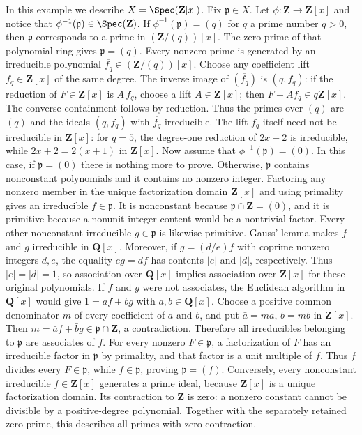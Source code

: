 \begin{example}
\label{editorial-source-example-spec-Zx}
In this example we describe $X = \Spec(\mathbf{Z}[x])$.
Fix $\mathfrak p \in X$.
Let $\phi : \mathbf{Z} \to \mathbf{Z}[x]$ and notice
that $\phi^{-1}(\mathfrak p) \in \Spec(\mathbf{Z})$.
If $\phi^{-1}(\mathfrak p) = (q)$ for $q$ a prime number $q > 0$,
then $\mathfrak p$ corresponds to a prime in $(\mathbf{Z}/(q))[x]$.
The zero prime of that polynomial ring gives $\mathfrak p=(q)$.
Every nonzero prime is generated by an irreducible polynomial
$\overline{f_q}\in(\mathbf{Z}/(q))[x]$.
Choose any coefficient lift $f_q\in\mathbf{Z}[x]$ of the same degree.
The inverse image of $(\overline{f_q})$ is $(q,f_q)$: if the reduction
of $F\in\mathbf Z[x]$ is $\overline A\,\overline{f_q}$, choose a lift
$A\in\mathbf Z[x]$; then $F-Af_q\in q\mathbf Z[x]$.
The converse containment follows by reduction.
Thus the primes over $(q)$ are $(q)$ and the ideals $(q,f_q)$ with
$\overline{f_q}$ irreducible. The lift $f_q$ itself need not be
irreducible in $\mathbf Z[x]$: for $q=5$, the degree-one reduction
of $2x+2$ is irreducible, while $2x+2=2(x+1)$ in $\mathbf Z[x]$.
Now assume that $\phi^{-1}(\mathfrak p)=(0)$.
In this case, if $\mathfrak p = (0)$ there is nothing more to prove. Otherwise, $\mathfrak p$ contains nonconstant polynomials
and it contains no nonzero integer. Factoring any nonzero member
in the unique factorization domain $\mathbf Z[x]$ and using primality
gives an irreducible $f\in\mathfrak p$. It is nonconstant because
$\mathfrak p\cap\mathbf Z=(0)$, and it is primitive because a
nonunit integer content would be a nontrivial factor.
Every other nonconstant irreducible $g\in\mathfrak p$ is likewise primitive.
Gauss' lemma makes $f$ and $g$ irreducible in $\mathbf Q[x]$.
Moreover, if $g=(d/e)f$ with coprime nonzero integers $d,e$,
the equality $eg=df$ has contents $|e|$ and $|d|$, respectively.
Thus $|e|=|d|=1$, so association over $\mathbf Q[x]$ implies
association over $\mathbf Z[x]$ for these original polynomials.
If $f$ and $g$ were not associates, the Euclidean algorithm in
$\mathbf Q[x]$ would give $1=af+bg$ with $a,b\in\mathbf Q[x]$.
Choose a positive common denominator $m$ of every coefficient of
$a$ and $b$, and put $\bar a=ma$, $\bar b=mb$ in $\mathbf Z[x]$.
Then $m=\bar a f+\bar b g\in\mathfrak p\cap\mathbf Z$, a contradiction.
Therefore all irreducibles belonging to $\mathfrak p$ are associates of $f$.
For every nonzero $F\in\mathfrak p$, a factorization of $F$ has
an irreducible factor in $\mathfrak p$ by primality, and that factor
is a unit multiple of $f$. Thus $f$ divides every $F\in\mathfrak p$,
while $f\in\mathfrak p$, proving $\mathfrak p=(f)$.
Conversely, every nonconstant irreducible $f\in\mathbf Z[x]$
generates a prime ideal, because $\mathbf Z[x]$ is a unique
factorization domain. Its contraction to $\mathbf Z$ is zero:
a nonzero constant cannot be divisible by a positive-degree polynomial.
Together with the separately retained zero prime, this describes
all primes with zero contraction.
\end{example}



